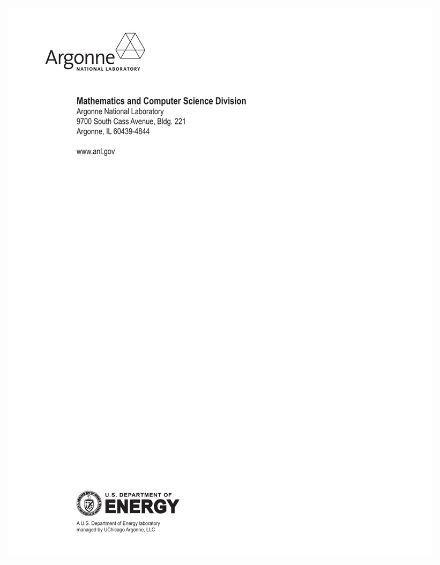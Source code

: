 \documentclass[twoside,11pt]{../sty/report_petsc}
\begin{document}
\pagestyle{empty}
\begin{figure}[hbt]
\centerline{\includegraphics{endpage}}
\end{figure}
\end{document}

